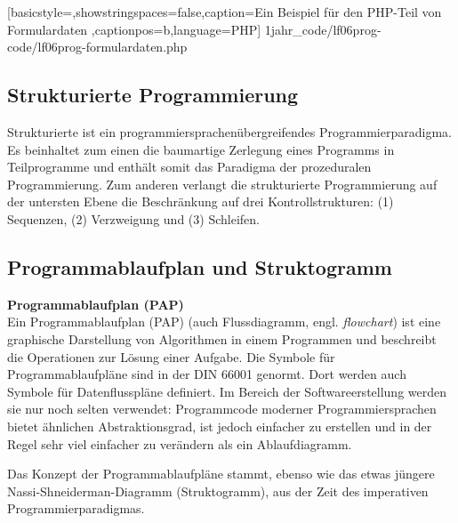 
	[basicstyle=\small,showstringspaces=false,caption={Ein Beispiel für den PHP-Teil von Formulardaten}
	\label{lst:html-formulardaten},captionpos=b,language=PHP]
	{1jahr_code/lf06prog-code/lf06prog-formulardaten.php}

\subsection{Strukturierte Programmierung}
Strukturierte ist ein programmiersprachenübergreifendes Programmierparadigma. Es beinhaltet zum einen die baumartige Zerlegung eines Programms in Teilprogramme und enthält somit das Paradigma der prozeduralen Programmierung. Zum anderen verlangt die strukturierte Programmierung auf der untersten Ebene die Beschränkung auf drei Kontrollstrukturen: (1) Sequenzen, (2) Verzweigung und (3) Schleifen.


\subsection{Programmablaufplan und Struktogramm}

{\bf Programmablaufplan (PAP)}~\\

Ein Programmablaufplan (PAP) (auch Flussdiagramm, engl. {\it flowchart}) ist eine graphische Darstellung von Algorithmen in einem Programmen und beschreibt die Operationen zur Lösung einer Aufgabe. Die Symbole für Programmablaufpläne sind in der DIN 66001 genormt. Dort werden auch Symbole für Datenflusspläne definiert. Im Bereich der Softwareerstellung werden sie nur noch selten verwendet: Programmcode moderner Programmiersprachen bietet ähnlichen Abstraktionsgrad, ist jedoch einfacher zu erstellen und in der Regel sehr viel einfacher zu verändern als ein Ablaufdiagramm.

Das Konzept der Programmablaufpläne stammt, ebenso wie das etwas jüngere Nassi-Shneiderman-Diagramm (Struktogramm), aus der Zeit des imperativen
Programmierparadigmas.

